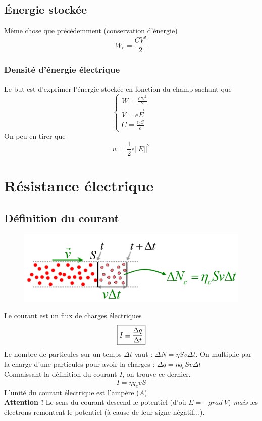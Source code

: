 \documentclass	[11pt, a4paper, openany]{book}
\begin{document}
\subsection{Énergie stockée}
Même chose que précédemment (conservation d'énergie)
\begin{equation}
W_e = \frac{CV^2}{2}
\end{equation}
\subsubsection{Densité d'énergie électrique}
Le but est d'exprimer l'énergie stockée en fonction du champ sachant  que
\begin{equation}
\left\{\begin{array}{l}
W = \frac{CV^2}{2}\\
V = e\vec{E}\\
C = \frac{\epsilon_0 S}{e}
\end{array}\right.
\end{equation}
On peu en tirer que 
\begin{equation}
w = \frac{1}{2}\epsilon||E||^2
\end{equation}


\section{Résistance électrique}
\subsection{Définition du courant}
\begin{figure}
\includegraphics[scale=0.44]{es/image17.png}
\end{figure}
Le courant est un flux de charges électriques 
\begin{equation}
\fbox{$I \equiv \dfrac{\Delta q}{\Delta t}$}
\end{equation}
Le nombre de particules sur un temps $\Delta t$ vaut : $\Delta N =  \eta S v\Delta t$. On multiplie par la charge d'une particules pour avoir la charges : $\Delta q = \eta q_e S v\Delta t$\\
Connaissant la définition du courant $I$, on trouve ce-dernier.
\begin{equation}
I = \eta q_e vS
\end{equation}
L'unité du courant électrique est l'ampère ($A$).\\
\textbf{Attention !} Le sens du courant descend le potentiel (d'où $E = -grad\ V$) \textit{mais} les électrons remontent le potentiel (à cause de leur signe négatif...).
\end{document}
